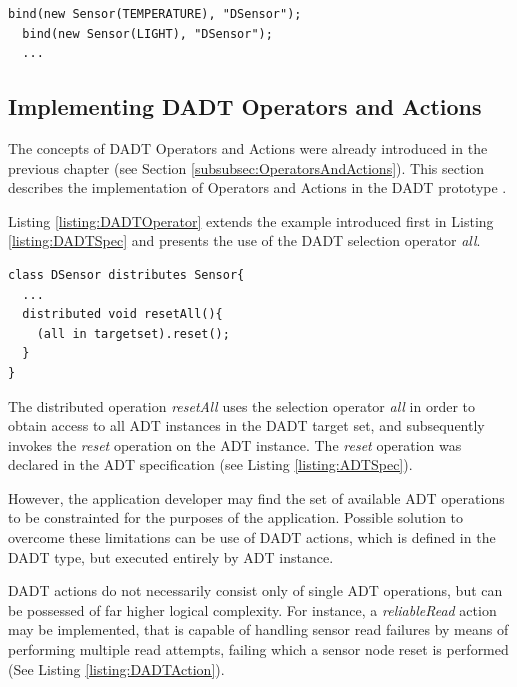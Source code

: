 \begin{lstlisting}[frame=trbl, basewidth={0.55em, 0.6em}, captionpos=b, 
basicstyle=\ttfamily\footnotesize, breaklines, caption = Binding ADT instances to a DADT instance, label = listing:binding]
  bind(new Sensor(TEMPERATURE), "DSensor");
  bind(new Sensor(LIGHT), "DSensor");
  ...
\end{lstlisting} 


\subsection{Implementing DADT Operators and Actions}
\label{subsubsec:OperatorsAndActionsImpl}

The concepts of DADT Operators and Actions were already introduced in the
previous chapter (see Section \ref{subsubsec:OperatorsAndActions}). This
section describes the implementation of Operators and Actions in the DADT prototype \cite{migliavaccaDADT:2006}.

Listing \ref{listing:DADTOperator} extends the example introduced first in
Listing \ref{listing:DADTSpec} and presents the use of the DADT selection
operator \emph{all}.

\begin{lstlisting}[frame=trbl, basewidth={0.55em, 0.6em}, captionpos=b, 
basicstyle=\ttfamily\footnotesize, breaklines, caption = Use of DADT Selection Operator, label = listing:DADTOperator]  
class DSensor distributes Sensor{
  ...
  distributed void resetAll(){
    (all in targetset).reset();
  }
}
\end{lstlisting}

The distributed operation \emph{resetAll} uses the selection operator 
\emph{all} in order to obtain access to all ADT instances in the DADT
target set, and subsequently invokes the \emph{reset} operation on the ADT
instance. The \emph{reset} operation was declared in the ADT specification
(see Listing \ref{listing:ADTSpec}).

However, the application developer may find the set of available ADT operations
to be constrainted for the purposes of the application. Possible solution to
overcome these limitations can be use of DADT actions, which is defined in the
DADT type, but executed entirely by ADT instance.

DADT actions do not necessarily consist only of single ADT operations, but can
be possessed of far higher logical complexity. For instance, a
\emph{reliableRead} action may be implemented, that is capable of handling sensor read failures by means of performing multiple read attempts, failing which
a sensor node reset is performed (See Listing \ref{listing:DADTAction}).
 
